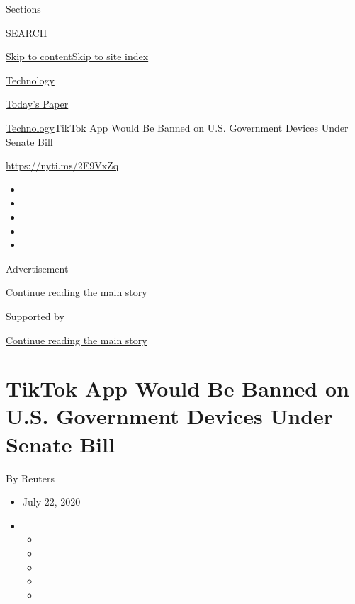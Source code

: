 Sections

SEARCH

\protect\hyperlink{site-content}{Skip to
content}\protect\hyperlink{site-index}{Skip to site index}

\href{https://www.nytimes3xbfgragh.onion/section/technology}{Technology}

\href{https://myaccount.nytimes3xbfgragh.onion/auth/login?response_type=cookie\&client_id=vi}{}

\href{https://www.nytimes3xbfgragh.onion/section/todayspaper}{Today's
Paper}

\href{/section/technology}{Technology}\textbar{}TikTok App Would Be
Banned on U.S. Government Devices Under Senate Bill

\url{https://nyti.ms/2E9VxZq}

\begin{itemize}
\item
\item
\item
\item
\item
\end{itemize}

Advertisement

\protect\hyperlink{after-top}{Continue reading the main story}

Supported by

\protect\hyperlink{after-sponsor}{Continue reading the main story}

\hypertarget{tiktok-app-would-be-banned-on-us-government-devices-under-senate-bill}{%
\section{TikTok App Would Be Banned on U.S. Government Devices Under
Senate
Bill}\label{tiktok-app-would-be-banned-on-us-government-devices-under-senate-bill}}

By Reuters

\begin{itemize}
\item
  July 22, 2020
\item
  \begin{itemize}
  \item
  \item
  \item
  \item
  \item
  \end{itemize}
\end{itemize}

